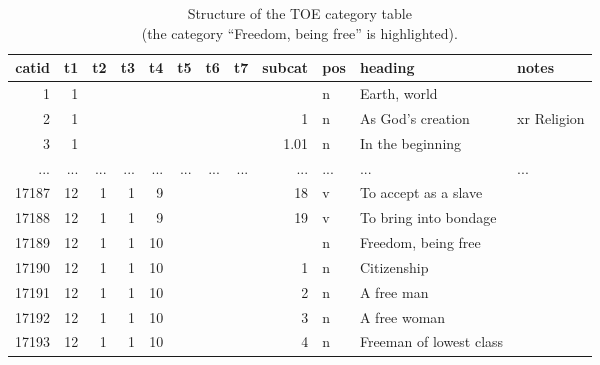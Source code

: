 \begin{table}[ht]
	\normalsize
	\center
	\setlength\tabcolsep{0.35em}
	\begin{tabular}{|r|r|r|r|r|r|r|r|r|l|l|l|}
		\hline
		\normalfont \bfseries catid & \normalfont \bfseries t1 & \normalfont \bfseries t2 & \normalfont \bfseries t3 & \normalfont \bfseries t4 & \normalfont \bfseries t5 & \normalfont \bfseries t6 & \normalfont \bfseries t7 & \normalfont \bfseries subcat & \normalfont \bfseries pos & \normalfont \bfseries heading & \normalfont \bfseries notes \\ \hline
		1     &   1 &     &     &     &     &     &     &      & n   & Earth, world & \\ \hline
		2     &   1 &     &     &     &     &     &     & 1    & n   & As God's creation & xr Religion \\ \hline 
		3     &   1 &     &     &     &     &     &     & 1.01 & n   & In the beginning & \\ \hline
        ...   & ... & ... & ... & ... & ... & ... & ... & ...  & ... & ... & ... \\ \hline 
		17187 &  12 &   1 &   1 &   9 &     &     &     & 18   & v   & To accept as a slave & \\ \hline
		17188 &  12 &   1 &   1 &   9 &     &     &     & 19   & v   & To bring into bondage & \\ \hline
\rowcolor{yellow}
		17189 &  12 &   1 &   1 &  10 &     &     &     &      & n   & Freedom, being free & \\ \hline
		17190 &  12 &   1 &   1 &  10 &     &     &     & 1    & n   & Citizenship & \\ \hline
		17191 &  12 &   1 &   1 &  10 &     &     &     & 2    & n   & A free man & \\ \hline
		17192 &  12 &   1 &   1 &  10 &     &     &     & 3    & n   & A free woman & \\ \hline
		17193 &  12 &   1 &   1 &  10 &     &     &     & 4    & n   & Freeman of lowest class & \\ \hline
	\end{tabular}
	\caption{Structure of the TOE category table\\(the category “Freedom, being free” is highlighted).\label{table:Stolk2019b:TOEtable-category}}
\end{table}

